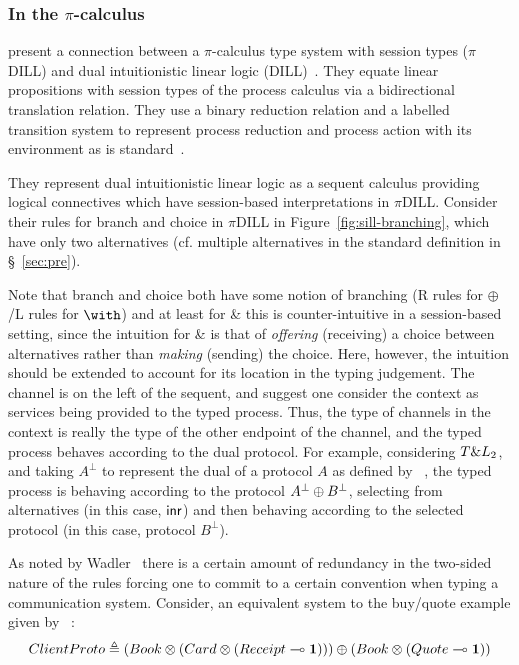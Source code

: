 \subsubsection{In the \texorpdfstring{$\pi$}{pi}-calculus}\label{sec:pis}

\citeauthor{Caires:2010:STI} \cite{Caires:2010:STI} present a connection
between a $\pi$-calculus type system with session types ($\pi$DILL) and dual
intuitionistic linear logic (DILL)~\cite{Barber:1996}. They equate linear
propositions with session types of the process calculus via a bidirectional
translation relation. They use a binary reduction relation and a labelled
transition system to represent process reduction and process action with its
environment as is standard~\cite{Sangiorgi:2001}.

%

They represent dual intuitionistic linear logic as a sequent calculus
providing logical connectives which have session-based interpretations in
$\pi$DILL. Consider their rules for branch and choice in $\pi$DILL in
Figure~\ref{fig:sill-branching}, which have only two alternatives
(cf. multiple alternatives in the standard definition in \S~\ref{sec:pre}).

Note that branch and choice both have some notion of branching (R rules for
$\oplus$/L rules for $\with$) and at least for \& this is counter-intuitive in
a session-based setting, since the intuition for \& is that of
\emph{offering} (receiving) a choice between alternatives rather than
\emph{making} (sending) the choice. Here, however, the intuition should be
extended to account for its location in the typing judgement. The channel is
on the left of the sequent, and \citeauthor{Caires:2010:STI} suggest one
consider the context as services being provided to the typed process. Thus,
the type of channels in the context is really the type of the other endpoint
of the channel, and the typed process behaves according to the dual
protocol. For example, considering $T \& L_2$, and taking $A^\bot$ to
represent the dual of a protocol $A$ as defined by
\citeauthor{Wadler:2014}~\cite{Wadler:2014}, the typed process is behaving
according to the protocol ${A^\bot}\oplus{B^\bot}$, selecting from
alternatives (in this case, $\mathsf{inr}$) and then behaving according to the
selected protocol (in this case, protocol $B^\bot$).

As noted by Wadler~\cite{Wadler:2014} there is a certain amount of redundancy
in the two-sided nature of the rules forcing one to commit to a certain
convention when typing a communication system. Consider, an equivalent system
to the buy/quote example given by
\citeauthor{Caires:2010:STI}~\cite[\S~3]{Caires:2010:STI}:
\begin{gather*}
{ClientProto}\triangleq{{({Book}\otimes{({Card}\otimes{({Receipt}\multimap{\mathbf{1}})})})}\oplus{({Book}\otimes{({Quote}\multimap{\mathbf{1}})})}}
\end{gather*}

